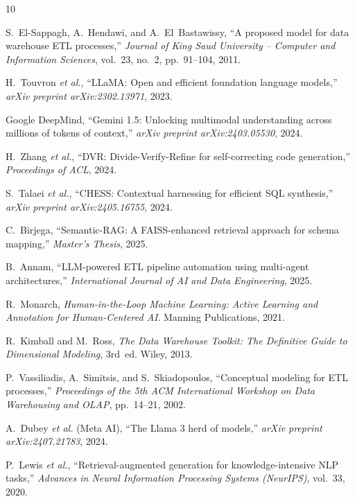 \documentclass[conference]{IEEEtran}
\begin{document}
\begin{thebibliography}{10}

S.~El-Sappagh, A.~Hendawi, and A.~El~Bastawissy,
``A proposed model for data warehouse ETL processes,''
\textit{Journal of King Saud University -- Computer and Information Sciences},
vol.~23, no.~2, pp.~91--104, 2011.

H.~Touvron \textit{et al.},
``LLaMA: Open and efficient foundation language models,''
\textit{arXiv preprint arXiv:2302.13971}, 2023.

Google DeepMind,
``Gemini 1.5: Unlocking multimodal understanding across millions of tokens of context,''
\textit{arXiv preprint arXiv:2403.05530}, 2024.

H.~Zhang \textit{et al.},
``DVR: Divide-Verify-Refine for self-correcting code generation,''
\textit{Proceedings of ACL}, 2024.

S.~Talaei \textit{et al.},
``CHESS: Contextual harnessing for efficient SQL synthesis,''
\textit{arXiv preprint arXiv:2405.16755}, 2024.

C.~Birjega,
``Semantic-RAG: A FAISS-enhanced retrieval approach for schema mapping,''
\textit{Master's Thesis}, 2025.

B.~Annam,
``LLM-powered ETL pipeline automation using multi-agent architectures,''
\textit{International Journal of AI and Data Engineering}, 2025.

R.~Monarch,
\textit{Human-in-the-Loop Machine Learning: Active Learning and Annotation for Human-Centered AI}.
Manning Publications, 2021.

R.~Kimball and M.~Ross,
\textit{The Data Warehouse Toolkit: The Definitive Guide to Dimensional Modeling},
3rd~ed. Wiley, 2013.

P.~Vassiliadis, A.~Simitsis, and S.~Skiadopoulos,
``Conceptual modeling for ETL processes,''
\textit{Proceedings of the 5th ACM International Workshop on Data Warehousing and OLAP},
pp.~14--21, 2002.

A.~Dubey \textit{et al.} (Meta AI),
``The Llama 3 herd of models,''
\textit{arXiv preprint arXiv:2407.21783}, 2024.

P.~Lewis \textit{et al.},
``Retrieval-augmented generation for knowledge-intensive NLP tasks,''
\textit{Advances in Neural Information Processing Systems (NeurIPS)},
vol.~33, 2020.


\end{thebibliography}
\end{document}
